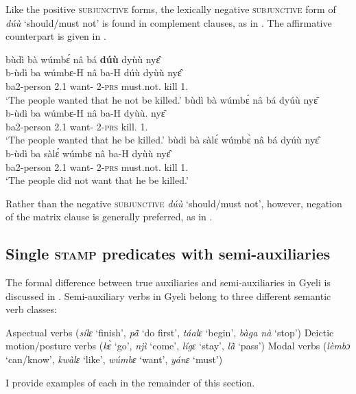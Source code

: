 Like the positive \textsc{subjunctive} forms, the lexically negative \textsc{subjunctive} form of {\itshape dúù} `should/must not' is found in complement clauses, as in . The affirmative counterpart is given in .

\ea\label{duu3}
\ea \label{duu3a}
  \glll bùdì bà wúmbɛ́ nâ bá {\bfseries dúù} dyùù nyɛ̂\\
         b-ùdì ba wúmbɛ-H nâ ba-H dúù dyùù nyɛ̂ \\
       ba2-person 2.{\PST}1 want-{\R} {\COMP} 2-\textsc{prs} must.not.{\SBJV} kill  1.{\OBJ} \\
    \trans `The people wanted that he not be killed.'
\ex\label{duu3b}
  \glll bùdì bà wúmbɛ́ nâ bá dyúù nyɛ̂\\
         b-ùdì ba wúmbɛ-H nâ ba-H dyùù.{\SBJV} nyɛ̂ \\
       ba2-person 2.{\PST}1 want-{\R} {\COMP} 2-\textsc{prs} kill.{\SBJV} 1.{\OBJ} \\
    \trans `The people wanted that he be killed.'
\ex\label{duu3c}
  \glll bùdì bà sàlɛ́ wúmbɛ̀ nâ bá dyúù nyɛ̂\\
         b-ùdì ba sàlɛ́ wúmbɛ nâ ba-H dyùù nyɛ̂ \\
       ba2-person 2.{\PST}1 want-{\R} {\COMP} 2-\textsc{prs} must.not.{\SBJV} kill 1.{\OBJ} \\
    \trans `The people did not want that he be killed.'
\z
\z

\noindent Rather than the negative \textsc{subjunctive} {\itshape dúù} `should/must not', however, negation of the matrix clause is generally preferred, as in .










\subsection{Single \textsc{stamp} predicates with semi-auxiliaries}
\label{sec:ComplSemi}

 The formal difference between true auxiliaries and semi-auxiliaries in Gyeli is discussed in . Semi-auxiliary verbs in Gyeli belong to three different semantic verb classes:
\begin{enumerate}
\itshapeem Aspectual verbs ({\itshape sílɛ} `finish', {\itshape pã̂} `do first', {\itshape táalɛ} `begin', {\itshape bàga nà} `stop')
\itshapeem Deictic motion/posture verbs ({\itshape kɛ̀} `go', {\itshape njì} `come', {\itshape lígɛ} `stay', {\itshape lã̀} `pass')
\itshapeem Modal verbs ({\itshape lèmbɔ} `can/know', {\itshape kwàlɛ} `like', {\itshape wúmbɛ} `want', {\itshape yánɛ} `must')
\end{enumerate}
I provide examples of each in the remainder of this section.



